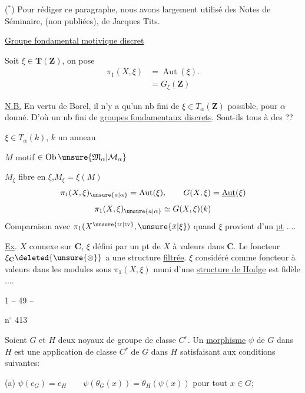 
($^*$) Pour rédiger ce paragraphe, nous avons largement utilisé des Notes de Séminaire, (non publiées), de Jacques Tits.

\uline{Groupe fondamental motivique discret}

Soit $\xi\in\mathbf T(\mathbf Z)$, on pose
\[
\begin{aligned}
\pi_1(X,\xi)&=\operatorname{Aut}(\xi).\\
&=G_\xi(\mathbf Z)
\end{aligned}
\]

\uline{N.B.} En vertu de Borel, il n'y a qu'un nb fini de $\xi\in T_\alpha(\mathbf Z)$ possible, pour $\alpha$ donné.
D'où un nb fini de \uline{groupes fondamentaux discrets}.
Sont-ils tous  à des   ??

$\xi\in T_\alpha(k)$, $k$ un anneau

$M$ motif $\in\operatorname{Ob}\unsure{\mathfrak M_\alpha|\mathcal M_\alpha}$

$M_\xi$ fibre en $\xi$,\qquad $M_\xi=\xi(M)$
\[
\pi_1(X,\xi)_{\unsure{a|\alpha}}=\operatorname{Aut}(\xi),\qquad
G(X,\xi)=\underline{\operatorname{Aut}}(\xi)
\]
\[
\pi_1(X,\xi)_{\unsure{a|\alpha}}\simeq G(X,\xi)(k)
\]
Comparaison avec $\pi_1(X^{\unsure{\mathrm{tr}|\mathrm{tv}}},\unsure{\bar x|\xi})$ quand $\xi$ provient d'un \uline{pt}  ....

\uline{Ex}. $X$ connexe sur $\mathbf C$, $\xi$ défini par un pt de $X$ à valeurs dans $\mathbf C$.
Le foncteur $\xi_{\mathbf C}\deleted{\unsure{\otimes}}$ a une structure \uline{filtrée}.
$\xi$ considéré comme foncteur à valeurs dans les modules sous $\pi_1(X,\xi)$ muni d'une \uline{structure de Hodge} est  fidèle ....

\begin{center}1 -- 49 --\end{center}\hfill n$^\circ$ 413

Soient $G$ et $H$ deux noyaux de groupe de classe $C^r$.
Un \uline{morphisme} $\psi$ de $G$ dans $H$ est une application de classe $C^r$ de $G$ dans $H$ satisfaisant aux conditions suivantes:

(a) $\psi(e_G)=e_H\qquad\psi(\theta_G(x))=\theta_H(\psi(x))$ pour tout $x\in G$;

